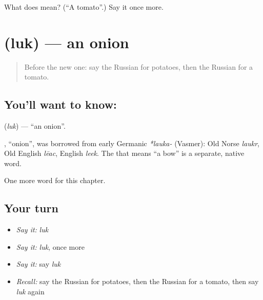 \begin{tcolorbox}[breakable,colback=teal!4,colframe=teal!35!black,title={Before you move on}]
What does  mean? (\textquotedblleft{}A tomato\textquotedblright{}.) Say it once more.
\end{tcolorbox}
\section[\texorpdfstring{\ru{лук} (luk)}{лук (luk)}]{ (luk) — an onion}

\label{lesson:RU-C45-onion}



\begin{quote}
Before the new one: say the Russian for potatoes, then the Russian for a tomato.
\end{quote}

\subsection*{You'll want to know: }
\textbf{} (\emph{luk}) — \textquotedblleft{}an onion\textquotedblright{}.

\begin{cousinweb}
\textbf{}, \textquotedblleft{}onion\textquotedblright{}, was borrowed from early Germanic \emph{*lauka-} (Vasmer): Old Norse \emph{laukr}, Old English \emph{lēac}, English \emph{leek}. The \emph{} that means \textquotedblleft{}a bow\textquotedblright{} is a separate, native word.
\end{cousinweb}

\begin{grammarlens}[title={What you've built}]
One more word for this chapter.
\end{grammarlens}

\subsection*{Your turn}
\begin{itemize}
\raggedright
  \item \emph{Say it:} \emph{luk}
  \item \emph{Say it:} \emph{luk}, once more
  \item \emph{Say it:} say \emph{luk}
  \item \emph{Recall:} say the Russian for potatoes, then the Russian for a tomato, then say \emph{luk} again
\end{itemize}


